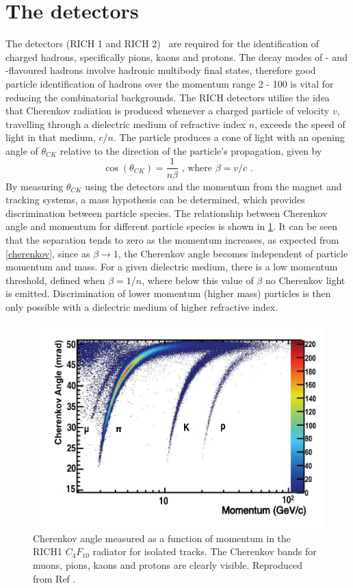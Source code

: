 \section{The \rich detectors}
\label{sec:detector:rich}

The \rich detectors (RICH 1 and RICH 2)~\cite{LHCb-DP-2012-003} are required for the identification of charged hadrons, specifically pions, kaons and protons. The decay modes of \bquark- and \cquark-flavoured hadrons involve hadronic multibody final states, therefore good particle identification of hadrons over the momentum range 2 - 100 \gevc is vital for reducing the combinatorial backgrounds. The RICH detectors utilise the idea that Cherenkov radiation is produced whenever a charged particle of velocity $v$, travelling through a dielectric medium of refractive index $n$, exceeds the speed of light in that medium, $c/n$. The particle produces a cone of light with an opening angle of $\theta_{CK}$ relative to the direction of the particle's propagation, given by
\begin{equation}
\cos\left(\theta_{CK}\right) = \frac{1}{n\beta} \text{ ,     where }  \beta = v/c \text{ .}
\label{cherenkov}
\end{equation}
By measuring $\theta_{CK}$ using the \rich detectors and the momentum from the magnet and tracking systems, a mass hypothesis can be determined, which provides discrimination between particle species. The relationship between Cherenkov angle and momentum for different particle species is shown in \fig\ref{richseparation}. It can be seen that the separation tends to zero as the momentum increases, as expected from \eqn\ref{cherenkov}, since as $\beta \rightarrow 1$, the Cherenkov angle becomes independent of particle momentum and mass. For a given dielectric medium, there is a low momentum threshold, defined when $\beta = 1/n$, where below this value of $\beta$ no Cherenkov light is emitted. Discrimination of lower momentum (higher mass) particles is then only possible with a dielectric medium of higher refractive index.

\begin{figure}
\centering
\includegraphics[width=0.8\linewidth]{figures/detector/richseparation.pdf}
\caption{Cherenkov angle measured as a function of momentum in the RICH1 $C_{4}F_{10}$ radiator for isolated tracks. The Cherenkov bands for muons, pions, kaons and protons are clearly visible. Reproduced from Ref \cite{LHCb-DP-2012-003}.}
\label{richseparation}
\end{figure}

